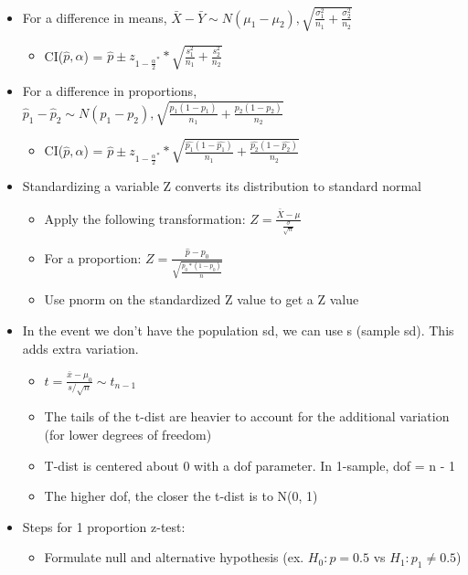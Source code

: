 \documentclass[8pt,landscape,a4paper, fleqn, dvipsnames]{extarticle}
\begin{document}
\begin{multicols*}{4}
\begin{itemize}
\begin{itemize}
    \end{itemize}
    \item For a difference in means, $\bar{X} - \bar{Y} \sim N(\mu_1 - \mu_2), \sqrt{\frac{\sigma_1^2}{n_1} + \frac{\sigma_2^2}{n_2}}$
    \begin{itemize}
        \item CI($\hat{p}, \alpha$) = $\hat{p} \pm z_{1 - \frac{\alpha}{2}^{*}} * \sqrt{\frac{s_1^2}{n_1} + \frac{s_2^2}{n_2}}$
    \end{itemize}
    \item For a difference in proportions, $\hat{p}_1 - \hat{p}_2 \sim N(p_1 - p_2), \sqrt{\frac{p_1(1 - p_1)}{n_1} + \frac{p_2(1 - p_2)}{n_2}}$
    \begin{itemize}
        \item CI($\hat{p}, \alpha$) = $\hat{p} \pm z_{1 - \frac{\alpha}{2}^{*}} * \sqrt{\frac{\hat{p_1}(1 - \hat{p_1})}{n_1} + \frac{\hat{p_2}(1 - \hat{p_2})}{n_2}}$
    \end{itemize}
    \item Standardizing a variable Z converts its distribution to standard normal
    \begin{itemize}
        \item Apply the following transformation: $Z = \frac{\bar{X} - \mu}{\frac{\sigma}{\sqrt{n}}}$
        \item For a proportion: $Z = \frac{\hat{p} - p_0}{\sqrt{\frac{p_0*(1 - p_0)}{n}}}$
        \item Use pnorm on the standardized Z value to get a Z value 
    \end{itemize}
    \item In the event we don't have the population sd, we can use s (sample sd). This adds extra variation.
    \begin{itemize}
        \item $t = \frac{\bar{x} - \mu_0}{s / \sqrt{n}} \sim t_{n - 1}$
        \item The tails of the t-dist are heavier to account for the additional variation (for lower degrees of freedom)
        \item T-dist is centered about 0 with a dof parameter. In 1-sample, dof = n - 1
        \item The higher dof, the closer the t-dist is to N(0, 1)
    \end{itemize}
    \item Steps for 1 proportion z-test:
    \begin{itemize}
        \item Formulate null and alternative hypothesis (ex. $H_0: p = 0.5$ vs $H_1: p_1 \neq 0.5$)

\end{itemize}
\end{itemize}
\end{multicols*}
\end{document}
